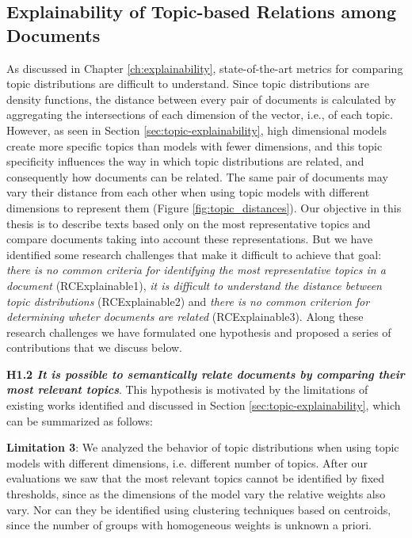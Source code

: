 \subsection{Explainability of Topic-based Relations among Documents}

As discussed in Chapter \ref{ch:explainability}, state-of-the-art metrics for comparing topic distributions are difficult to understand. Since topic distributions are density functions, the distance between every pair of documents is calculated by aggregating the intersections of each dimension of the vector, i.e., of each topic. However, as seen in Section \ref{sec:topic-explainability}, high dimensional models create more specific topics than models with fewer dimensions, and this topic specificity influences the way in which topic distributions are related, and consequently how documents can be related. The same pair of documents may vary their distance from each other when using topic models with different dimensions to represent them (Figure \ref{fig:topic_distances}). Our objective in this thesis is to describe texts based only on the most representative topics and compare documents taking into account these representations. But we have identified some research challenges that make it difficult to achieve that goal: \textit{there is no common criteria for identifying the most representative topics in a document} (RCExplainable1), \textit{it is difficult to understand the distance between topic distributions} (RCExplainable2) and \textit{there is no common criterion for determining wheter documents are related} (RCExplainable3). Along these research challenges we have formulated one hypothesis and proposed a series of contributions that we discuss below.

\textbf{H1.2 \textit{It is possible to semantically relate documents by comparing their most relevant topics}}. This hypothesis is motivated by the limitations of existing works identified and discussed in Section \ref{sec:topic-explainability}, which can be summarized as follows:

\textbf{Limitation 3}: We analyzed the behavior of topic distributions when using topic models with different dimensions, i.e. different number of topics. After our evaluations we saw that the most relevant topics cannot be identified by fixed thresholds, since as the dimensions of the model vary the relative weights also vary. Nor can they be identified using clustering techniques based on centroids, since the number of groups with homogeneous weights is unknown a priori.

